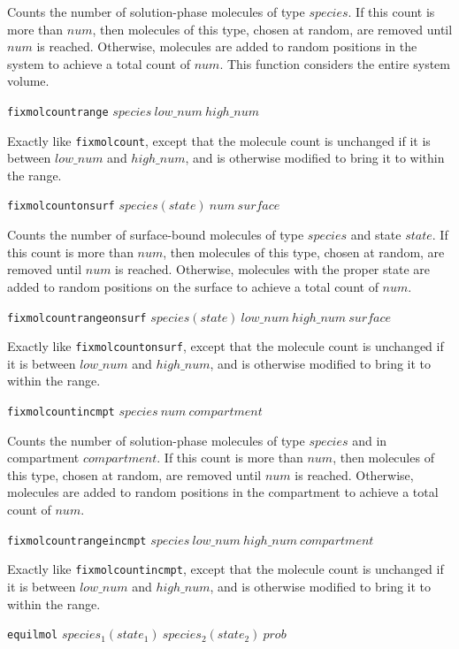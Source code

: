 \documentclass {scrbook}
\newcommand {\ttt} {\texttt}
\begin{document}
\begin{description}
Counts the number of solution-phase molecules of type $species$. If this count is more than $num$, then molecules of this type, chosen at random, are removed until $num$ is reached. Otherwise, molecules are added to random positions in the system to achieve a total count of $num$. This function considers the entire system volume.

\item{\ttt{fixmolcountrange} $species\ low\_num\ high\_num$}

Exactly like \ttt{fixmolcount}, except that the molecule count is unchanged if it is between $low\_num$ and $high\_num$, and is otherwise modified to bring it to within the range.

\item{\ttt{fixmolcountonsurf} $species(state)\ num\ surface$}

Counts the number of surface-bound molecules of type $species$ and state $state$. If this count is more than $num$, then molecules of this type, chosen at random, are removed until $num$ is reached. Otherwise, molecules with the proper state are added to random positions on the surface to achieve a total count of $num$.

\item{\ttt{fixmolcountrangeonsurf} $species(state)\ low\_num\ high\_num\ surface$}

Exactly like \ttt{fixmolcountonsurf}, except that the molecule count is unchanged if it is between $low\_num$ and $high\_num$, and is otherwise modified to bring it to within the range.

\item{\ttt{fixmolcountincmpt} $species\ num\ compartment$}

Counts the number of solution-phase molecules of type $species$ and in compartment $compartment$. If this count is more than $num$, then molecules of this type, chosen at random, are removed until $num$ is reached. Otherwise, molecules are added to random positions in the compartment to achieve a total count of $num$.

\item{\ttt{fixmolcountrangeincmpt} $species\ low\_num\ high\_num\ compartment$}

Exactly like \ttt{fixmolcountincmpt}, except that the molecule count is unchanged if it is between $low\_num$ and $high\_num$, and is otherwise modified to bring it to within the range.

\item{\ttt{equilmol} $species_1(state_1)\ species_2(state_2)\ prob$}


\end{description}
\end{document}
